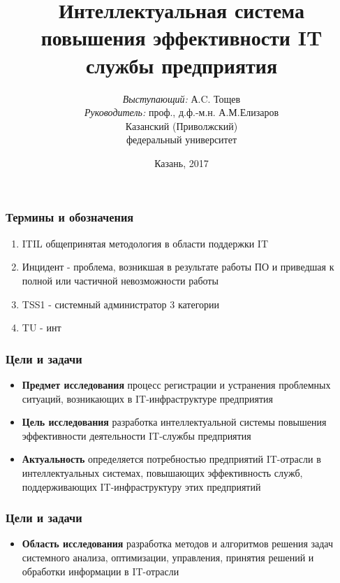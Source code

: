\documentclass[14pt]{beamer}
\title{\small{Интеллектуальная система повышения эффективности IT службы предприятия}}
\author{\small{%
\emph{Выступающий:} А.C. Тощев\\%
\emph{Руководитель:} проф., д.ф.-м.н. А.М.Елизаров}\\%
\vspace{30pt}%
Казанский (Приволжский)\\
федеральный университет%
\vspace{20pt}%
}
\date{\small{Казань, 2017}}
\begin{document}
\maketitle

\begin{frame}
\frametitle{Термины и обозначения}
\begin{enumerate}
    \item ITIL общепринятая методология в области поддержки IT
    \item Инцидент - проблема, возникшая в результате работы ПО и приведшая к полной или частичной невозможности работы
    \item TSS1 - системный администратор 3 категории
    \item TU - инт
  
\end{enumerate}
\end{frame}

\begin{frame}
\frametitle{Цели и задачи}
\begin{itemize}
  \item \textbf{Предмет исследования} процесс регистрации и устранения проблемных ситуаций, возникающих в IT-инфраструктуре предприятия 
  \item \textbf{Цель исследования}  разработка интеллектуальной системы повышения эффективности деятельности IT-службы предприятия
  \item \textbf{Актуальность} определяется потребностью предприятий IT-отрасли в интеллектуальных системах, повышающих эффективность служб, поддерживающих IT-инфраструктуру этих предприятий
\end{itemize}
\end{frame}

\begin{frame}
\frametitle{Цели и задачи}
\begin{itemize}
    \item \textbf{Область исследования} разработка методов и алгоритмов решения задач системного анализа, оптимизации, управления, принятия решений и обработки информации в IT-отрасли %
\end{itemize}
\end{frame}
\end{document}
